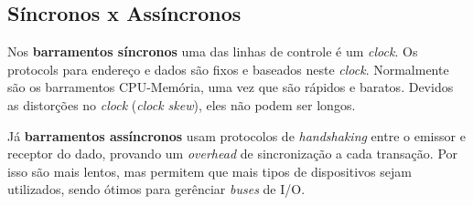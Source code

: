 \subsection{Síncronos x Assíncronos}
Nos \textbf{barramentos síncronos} uma das linhas de controle é um \textit{clock}. Os protocols para endereço e dados são fixos e baseados neste \textit{clock}. Normalmente são os barramentos CPU-Memória, uma vez que são rápidos e baratos. Devidos as distorções no \textit{clock} (\textit{clock skew}), eles não podem ser longos.

Já \textbf{barramentos assíncronos} usam protocolos de \textit{handshaking} entre o emissor e receptor do dado, provando um \textit{overhead} de sincronização a cada transação. Por isso são mais lentos, mas permitem que mais tipos de dispositivos sejam utilizados, sendo ótimos para gerênciar \textit{buses} de I/O.
